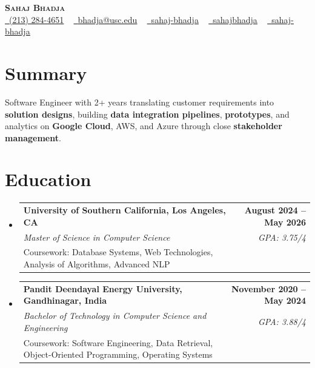 \documentclass[letterpaper,10pt]{article}
\makeatletter
\newcommand{\sectionGap}{\vspace{-8pt}}
\newcommand{\resumeEduSubheading}[5]{\vspace{-1pt}\item\begin{tabular*}{1.0\textwidth}[t]{l@{\extracolsep{\fill}}r}\textbf{#1} & \textbf{\small #2} \\\textit{\small #3} & \textit{\small #4} \\\small #5 & \\\end{tabular*}\vspace{-4pt}}
\newcommand{\resumeSubHeadingListStart}{\begin{itemize}[leftmargin=0.0in, label={}]}
\newcommand{\resumeSubHeadingListEnd}{\end{itemize}}
\makeatother
\begin{document}
\begin{center}
{\Huge \scshape \textbf{Sahaj Bhadja}} \\ \vspace{1pt}
\small \href{tel:2132844651}{\faPhone\ \underline{(213) 284-4651}} ~ \href{mailto:bhadja@usc.edu}{\raisebox{-0.2\height}\faEnvelope\ \underline{bhadja@usc.edu}} ~
\href{https://www.linkedin.com/in/sahaj-bhadja/}{\raisebox{-0.2\height}\faLinkedin\ \underline{sahaj-bhadja}} ~ \href{https://github.com/SAHAJ-BHADJA}{\raisebox{-0.2\height}\faGithub\ \underline{sahajbhadja}} ~
\href{https://sahaj-bhadja.vercel.app/}{\raisebox{-0.2\height}\faGlobe\ \underline{sahaj-bhadja}}
\end{center}
\vspace{-16pt}
\section{Summary}
\begin{itemize}[leftmargin=0.15in, label={}]
\small{\item{Software Engineer with 2+ years translating customer requirements into \textbf{solution designs}, building \textbf{data integration pipelines}, \textbf{prototypes}, and analytics on \textbf{Google Cloud}, AWS, and Azure through close \textbf{stakeholder management}.}}
\end{itemize}
\sectionGap
\section{Education}
\resumeSubHeadingListStart
\resumeEduSubheading{University of Southern California, Los Angeles, CA}{August 2024 -- May 2026}{Master of Science in Computer Science}{GPA: 3.75/4}{Coursework: Database Systems, Web Technologies, Analysis of Algorithms, Advanced NLP}
\resumeEduSubheading{Pandit Deendayal Energy University, Gandhinagar, India}{November 2020 -- May 2024}{Bachelor of Technology in Computer Science and Engineering}{GPA: 3.88/4}{Coursework: Software Engineering, Data Retrieval, Object-Oriented Programming, Operating Systems}
\resumeSubHeadingListEnd
\sectionGap
\end{document}
